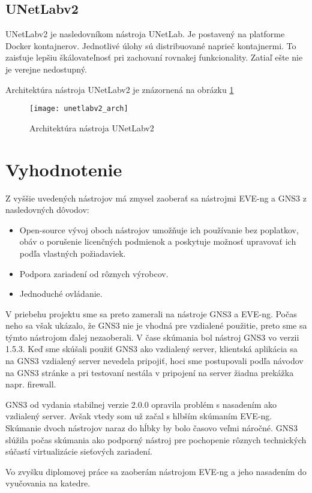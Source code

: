 \subsection{UNetLabv2}

UNetLabv2 je nasledovníkom nástroja UNetLab. Je postavený na platforme Docker kontajnerov. Jednotlivé úlohy sú distribuované naprieč kontajnermi. To zaisťuje lepšiu škálovateľnosť pri zachovaní rovnakej funkcionality. Zatiaľ ešte nie je verejne nedostupný.

Architektúra nástroja UNetLabv2 je znázornená na obrázku \ref{obr:unetlabv2_arch}

\begin{figure}
    \centering
    \texttt{[image: unetlabv2\_arch]}
    \caption{Architektúra nástroja UNetLabv2} \cite{obr_unetlabv2_arch}
    \label{obr:unetlabv2_arch}
\end{figure}

\section{Vyhodnotenie}

Z vyššie uvedených nástrojov má zmysel zaoberať sa nástrojmi EVE-ng a GNS3 z nasledovných dôvodov:
\begin{itemize}
    \item Open-source vývoj oboch nástrojov umožňuje ich používanie bez poplatkov, obáv o porušenie licenčných podmienok a poskytuje možnosť upravovať ich podľa vlastných požiadaviek.
    \item Podpora zariadení od rôznych výrobcov.
    \item Jednoduché ovládanie.
\end{itemize}

V priebehu projektu sme sa preto zamerali na nástroje GNS3 a EVE-ng. Počas neho sa však ukázalo, že GNS3 nie je vhodná pre vzdialené použitie, preto sme sa týmto nástrojom ďalej nezaoberali. V čase skúmania bol nástroj GNS3 vo verzii 1.5.3. Keď sme skúšali použiť GNS3 ako vzdialený server, klientská aplikácia sa na GNS3 vzdialený server nevedela pripojiť, hoci sme postupovali podľa návodov na GNS3 stránke a pri testovaní nestála v pripojení na server žiadna prekážka napr. firewall.

GNS3 od vydania stabilnej verzie 2.0.0 opravila problém s nasadením ako vzdialený server. Avšak vtedy som už začal s hlbším skúmaním EVE-ng. Skúmanie dvoch nástrojov naraz do hĺbky by bolo časovo veľmi náročné. GNS3 slúžila počas skúmania ako podporný nástroj pre pochopenie rôznych technických súčastí virtualizácie sieťových zariadení.

Vo zvyšku diplomovej práce sa zaoberám nástrojom EVE-ng a jeho nasadením do vyučovania na katedre.
